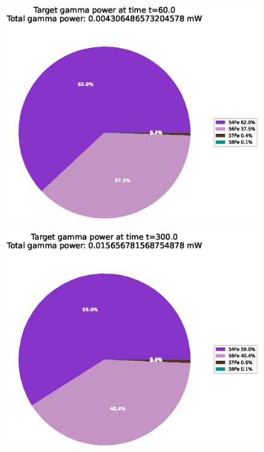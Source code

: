 \begin{figure}[!htb]
\centering
\includegraphics[width=0.8\linewidth]{chapters/results_activity_code/fe-activity-v2/target-energy/0020_60.eps}
\caption{}
\label{fig:activity-v2-target-power-60s}
\end{figure}

\begin{figure}[!htb]
\centering
\includegraphics[width=0.8\linewidth]{chapters/results_activity_code/fe-activity-v2/target-energy/0100_300.eps}
\caption{}
\label{fig:activity-v2-target-power-300s}
\end{figure}


